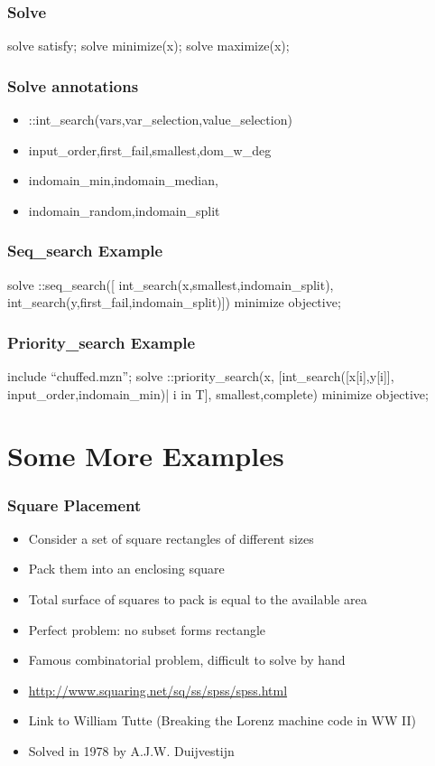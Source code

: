 \begin{frame}[fragile]
  \frametitle{Solve}
  \begin{semiverbatim}
    solve satisfy;
    solve minimize(x);
    solve maximize(x);
  \end{semiverbatim}
\end{frame}

\begin{frame}
  \frametitle{Solve annotations}
  \begin{itemize}
  \item ::int\_search(vars,var\_selection,value\_selection)
  \item input\_order,first\_fail,smallest,dom\_w\_deg
  \item indomain\_min,indomain\_median,
    \item indomain\_random,indomain\_split
  \end{itemize}
\end{frame}

\begin{frame}[fragile]
  \frametitle{Seq\_search Example}
  \begin{semiverbatim}
solve ::seq_search([
    int_search(x,smallest,indomain_split),
    int_search(y,first_fail,indomain_split)])
    minimize objective;
  \end{semiverbatim}
\end{frame}

\begin{frame}[fragile]
  \frametitle{Priority\_search Example}
  \begin{semiverbatim}
include ``chuffed.mzn'';
solve ::priority_search(x,
       [int_search([x[i],y[i]],
        input_order,indomain_min)| i in T],
        smallest,complete)
    minimize objective;
  \end{semiverbatim}
\end{frame}

\section{Some More Examples}

\begin{frame}
  \frametitle{Square Placement}
  \begin{itemize}
  \item Consider a set of square rectangles of different sizes
  \item Pack them into an enclosing square
    \item Total surface of squares to pack is equal to the available area
    \item Perfect problem: no subset forms rectangle
    \item Famous combinatorial problem, difficult to solve by hand
      \item \url{http://www.squaring.net/sq/ss/spss/spss.html}
      \item Link to William Tutte (Breaking the Lorenz machine code in WW II)
        \item Solved in 1978 by A.J.W. Duijvestijn
  \end{itemize}
\end{frame}

